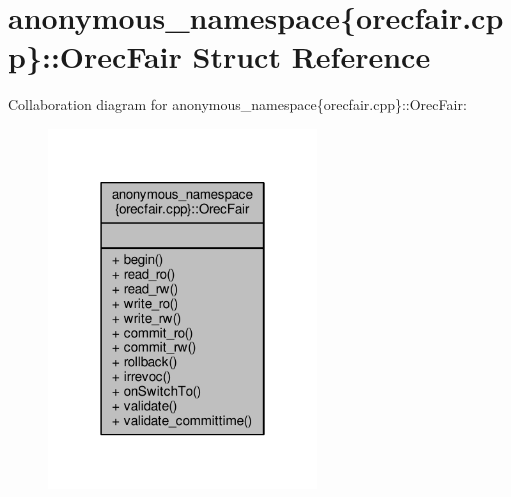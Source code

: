 \hypertarget{structanonymous__namespace_02orecfair_8cpp_03_1_1OrecFair}{\section{anonymous\-\_\-namespace\{orecfair.\-cpp\}\-:\-:Orec\-Fair Struct Reference}
\label{structanonymous__namespace_02orecfair_8cpp_03_1_1OrecFair}
}


Collaboration diagram for anonymous\-\_\-namespace\{orecfair.\-cpp\}\-:\-:Orec\-Fair\-:
\nopagebreak
\begin{figure}[H]
\begin{center}
\leavevmode
\includegraphics[width=202pt]{structanonymous__namespace_02orecfair_8cpp_03_1_1OrecFair__coll__graph}
\end{center}
\end{figure}
